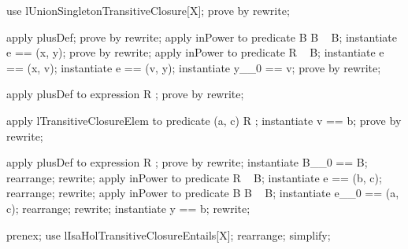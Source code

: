 \begin{LPScript}\begin{forget}[lUnionSingletonTransitiveClosure2]
use lUnionSingletonTransitiveClosure[X];
prove by rewrite;
\end{forget}\end{LPScript}

\begin{LPScript}\begin{forget}[lTransitiveClosureElem]
apply plusDef;
prove by rewrite;
apply inPower to predicate B \comp [X, X, X] B \in  \power~  B;
instantiate e == (x, y);
prove by rewrite;
apply inPower to predicate R \in  \power~  B;
instantiate e == (x, v);
instantiate e == (v, y);
instantiate y\_\_0 == v;
prove by rewrite;
\end{forget}\end{LPScript}

\begin{LPScript}\begin{forget}[lTransitiveClosureElemType]
apply plusDef to expression R \plus [X];
prove by rewrite;
\end{forget}\end{LPScript}

\begin{LPScript}\begin{forget}[lIsaHolIntoTransitiveClosure]
apply lTransitiveClosureElem to predicate (a, c) \in  R \plus [X];
instantiate v == b;
prove by rewrite;
\end{forget}\end{LPScript}

\begin{LPScript}\begin{forget}[lIsaHolTransitiveClosureEntails]
apply plusDef to expression R \plus [X];
prove by rewrite;
instantiate B\_\_0 == B;
rearrange;
rewrite;
apply inPower to predicate R \in  \power~  B;
instantiate e == (b, c);
rearrange;
rewrite;
apply inPower to predicate B \comp [X, X, X] B \in  \power~  B;
instantiate e\_\_0 == (a, c);
rearrange;
rewrite;
instantiate y == b;
rewrite;
\end{forget}\end{LPScript}

\begin{LPScript}\begin{forget}[lIsaHolTransitiveClosureEntails2]
prenex;
use lIsaHolTransitiveClosureEntails[X];
rearrange;
simplify;
\end{forget}\end{LPScript}

